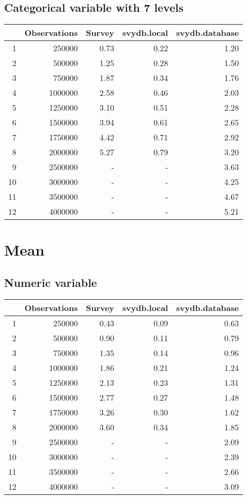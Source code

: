 \subsection{Categorical variable with 7 levels}
\begin{table}[ht]
\centering
\begin{tabular}{rrrrr}
  \hline
 & Observations & Survey & svydb.local & svydb.database \\ 
  \hline
1 & 250000 & 0.73 & 0.22 & 1.20 \\ 
  2 & 500000 & 1.25 & 0.28 & 1.50 \\ 
  3 & 750000 & 1.87 & 0.34 & 1.76 \\ 
  4 & 1000000 & 2.58 & 0.46 & 2.03 \\ 
  5 & 1250000 & 3.10 & 0.51 & 2.28 \\ 
  6 & 1500000 & 3.94 & 0.61 & 2.65 \\ 
  7 & 1750000 & 4.42 & 0.71 & 2.92 \\ 
  8 & 2000000 & 5.27 & 0.79 & 3.20 \\ 
  9 & 2500000 & - & - & 3.63 \\ 
  10 & 3000000 & - & - & 4.25 \\ 
  11 & 3500000 & - & - & 4.67 \\ 
  12 & 4000000 & - & - & 5.21 \\ 
   \hline
\end{tabular}
\end{table}

\section{Mean}
\subsection{Numeric variable}
\begin{table}[ht]
\centering
\begin{tabular}{rrrrr}
  \hline
 & Observations & Survey & svydb.local & svydb.database \\ 
  \hline
1 & 250000 & 0.43 & 0.09 & 0.63 \\ 
  2 & 500000 & 0.90 & 0.11 & 0.79 \\ 
  3 & 750000 & 1.35 & 0.14 & 0.96 \\ 
  4 & 1000000 & 1.86 & 0.21 & 1.24 \\ 
  5 & 1250000 & 2.13 & 0.23 & 1.31 \\ 
  6 & 1500000 & 2.77 & 0.27 & 1.48 \\ 
  7 & 1750000 & 3.26 & 0.30 & 1.62 \\ 
  8 & 2000000 & 3.60 & 0.34 & 1.85 \\ 
  9 & 2500000 & - & - & 2.09 \\ 
  10 & 3000000 & - & - & 2.39 \\ 
  11 & 3500000 & - & - & 2.66 \\ 
  12 & 4000000 & - & - & 3.09 \\ 
   \hline
\end{tabular}
\end{table}

